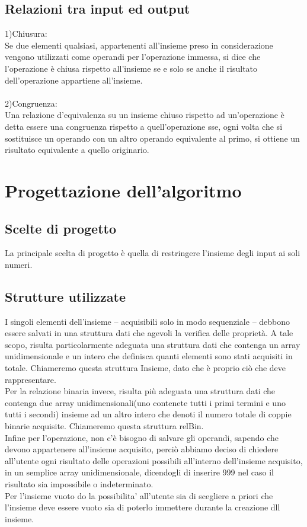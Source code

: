﻿\documentclass[11pt,a4paper,titlepage,block]{article}
\begin{document}
	\subsection{Relazioni tra input ed output}
	1)Chiusura:\\
	Se due elementi qualsiasi, appartenenti all'insieme preso in considerazione vengono utilizzati come operandi per l'operazione immessa, si dice che l'operazione è chiusa rispetto all'insieme se e solo se anche il risultato dell'operazione appartiene all'insieme.
	\\
	\\
	2)Congruenza:\\Una relazione d'equivalenza su un insieme chiuso rispetto ad un'operazione è detta essere una congruenza
	rispetto a quell'operazione sse, ogni volta che si sostituisce un operando con un altro operando
	equivalente al primo, si ottiene un risultato equivalente a quello originario.
	\newpage
	\section{Progettazione dell'algoritmo}
	\subsection{Scelte di progetto}
	La principale scelta di progetto è quella di restringere l'insieme degli input ai soli numeri.
	\subsection{Strutture utilizzate}
	I singoli elementi dell'insieme – acquisibili solo in modo sequenziale – debbono essere salvati in una struttura
	dati che agevoli la verifica delle proprietà.  A tale scopo, risulta particolarmente
	adeguata una struttura dati che contenga un array unidimensionale e un intero che definisca quanti elementi sono stati acquisiti in totale. Chiameremo questa struttura Insieme, dato che è proprio ciò che deve rappresentare.
	\\
	Per la relazione binaria invece, risulta più adeguata una struttura dati che contenga due array unidimensionali(uno contenete tutti i primi termini e uno tutti i secondi) insieme ad un altro intero che denoti il numero totale di coppie binarie acquisite. Chiameremo questa struttura relBin.
	\\
	Infine per l'operazione, non c'è bisogno di salvare gli operandi, sapendo che devono appartenere all'insieme acquisito, perciò abbiamo deciso di chiedere all'utente ogni risultato delle operazioni possibili all'interno dell'insieme acquisito, in un semplice array unidimensionale, dicendogli di inserire 999 nel caso il risultato sia impossibile o indeterminato.
	\\
	Per l'insieme vuoto do la possibilita' all'utente sia di scegliere a priori che l'insieme deve essere vuoto sia di poterlo immettere durante la creazione dll insieme.
\end{document}
